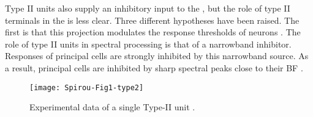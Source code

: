 Type II units also supply an inhibitory input to the \VCN
\citep{WickesbergOertel:1990}, but the role of type II terminals in the \VCN is
less clear. Three different hypotheses have been raised. The ﬁrst is that this
projection modulates the response thresholds of \VCN neurons
\citep{PaoliniClark:1998}.  The role of type II units in spectral processing is
that of a narrowband inhibitor. Responses of \DCN principal cells are strongly
inhibited by this narrowband source. As a result, \DCN principal cells are
inhibited by sharp spectral peaks close to their BF
\citep{SpirouDavisEtAl:1999}.%

\begin{figure}[htb]
  \centering
\texttt{[image: Spirou-Fig1-type2]}
\caption{Experimental data of a single Type-II \DCN unit \citep[Fig.~1]{SpirouDavisEtAl:1999}.}
  \label{fig:SpirouFig1}
\end{figure}











